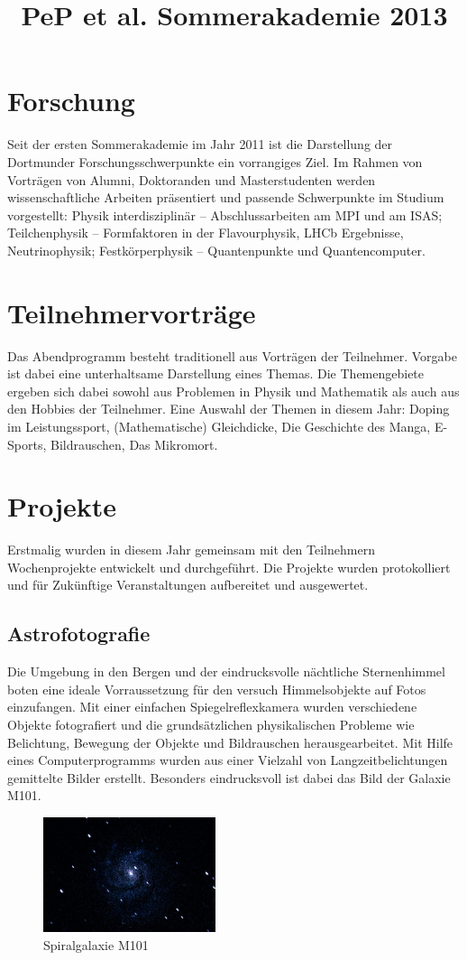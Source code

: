 \documentclass[pdftex, twocolumn=true, parskip=half]{scrartcl}
\begin{document}
\title{PeP et al. Sommerakademie 2013}

\maketitle
\section{Forschung}
Seit der ersten Sommerakademie im Jahr 2011 ist die Darstellung der Dortmunder Forschungsschwerpunkte ein vorrangiges Ziel. Im Rahmen von Vorträgen von Alumni, Doktoranden und Masterstudenten werden wissenschaftliche Arbeiten präsentiert und passende Schwerpunkte im Studium vorgestellt: Physik interdisziplinär -- Abschlussarbeiten am MPI und am ISAS; Teilchenphysik -- Formfaktoren in der Flavourphysik, LHCb Ergebnisse, Neutrinophysik; Festkörperphysik -- Quantenpunkte und Quantencomputer.
\section{Teilnehmervorträge}
Das Abendprogramm besteht traditionell aus Vorträgen der Teilnehmer. Vorgabe ist dabei eine unterhaltsame Darstellung eines Themas. Die Themengebiete ergeben sich dabei sowohl aus Problemen in Physik und Mathematik als auch aus den Hobbies der Teilnehmer. Eine Auswahl der Themen in diesem Jahr: Doping im Leistungssport, (Mathematische) Gleichdicke, Die Geschichte des Manga, E-Sports, Bildrauschen, Das Mikromort.
\section{Projekte}
Erstmalig wurden in diesem Jahr gemeinsam mit den Teilnehmern Wochenprojekte entwickelt und durchgeführt. Die Projekte wurden protokolliert und für Zukünftige Veranstaltungen aufbereitet und ausgewertet.
\subsection{Astrofotografie}
Die Umgebung in den Bergen und der eindrucksvolle nächtliche Sternenhimmel boten eine ideale Vorraussetzung für den versuch Himmelsobjekte auf Fotos einzufangen. Mit einer einfachen Spiegelreflexkamera wurden verschiedene Objekte fotografiert und die grundsätzlichen physikalischen Probleme wie Belichtung, Bewegung der Objekte und Bildrauschen herausgearbeitet. Mit Hilfe eines Computerprogramms wurden aus einer Vielzahl von Langzeitbelichtungen gemittelte Bilder erstellt. Besonders eindrucksvoll ist dabei das Bild der Galaxie M101.
\begin{figure}[!h]
\centering
\includegraphics[width=0.45\textwidth]{figs/astro/m101_add_50.jpg}
\caption{Spiralgalaxie M101}
\end{figure}
\end{document}
